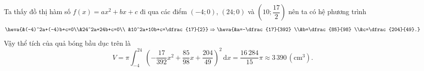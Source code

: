 \begin{bt}
{\begin{center}
		\end{center}Ta thấy đồ thị hàm số $f(x)=ax^2+bx+c$ đi qua các điểm $(-4;0)$, $(24;0)$ và $\left(10;\dfrac{17}{2}\right)$ nên ta có
		hệ phương trình 
		\[\heva{&(-4)^2a+(-4)b+c=0\\&24^2a+24b+c=0\\ &10^2a+10b+c=\dfrac{17}{2}}\Rightarrow \heva{&a=-\dfrac{17}{392}  \\&b=\dfrac{85}{98} \\&c=\dfrac{204}{49}.}\]
		Vậy thể tích của quả  bóng bầu dục trên là
	\[V=\pi\displaystyle\int_{-4}^{24} \left(-\dfrac{17}{392}x^2+\dfrac{85}{98}x+\dfrac{204}{49}\right)^2 \mathrm{\,d}x=\dfrac{16\,284}{15}\pi \approx 3\,390\,(\text{cm}^3).\]} 
\end{bt}
